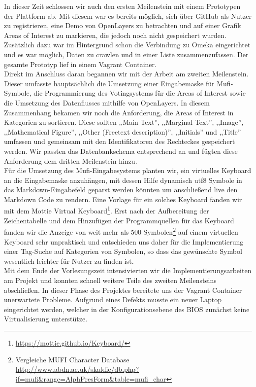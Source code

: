\documentclass{article}
\begin{document}
In dieser Zeit schlossen wir auch den ersten Meilenstein mit einem Prototypen der Plattform ab. 
Mit diesem war es bereits möglich, sich über GitHub als Nutzer zu registrieren, eine Demo von OpenLayers zu betrachten und 
auf einer Grafik Areas of Interest zu markieren, die jedoch noch nicht gespeichert wurden. 
Zusätzlich dazu war im Hintergrund schon die Verbindung zu Omeka eingerichtet und es war möglich, 
Daten zu crawlen und in einer Liste zusammenzufassen. Der gesamte Prototyp lief in einem Vagrant Container.\\
Direkt im Anschluss daran begannen wir mit der Arbeit am zweiten Meilenstein. 
Dieser umfasste hauptsächlich die Umsetzung einer Eingabemaske für Mufi-Symbole, die Programmierung des Votingsystems für die Areas of Interest sowie die Umsetzung des Datenflusses mithilfe von OpenLayers.
In diesem Zusammenhang bekamen wir noch die Anforderung, die Areas of Interest in Kategorien zu sortieren. Diese sollten ,,Main Text'', ,,Marginal Text'', ,,Image'', ,,Mathematical Figure'', ,,Other (Freetext description)'', ,,Initials'' und ,,Title'' 
umfassen und gemeinsam mit den Identifikatoren des Rechteckes gespeichert werden.
Wir passten das Datenbankschema entsprechend an und fügten diese Anforderung dem dritten Meilenstein hinzu.\\
Für die Umsetzung des Mufi-Eingabesystems planten wir, ein virtuelles Keyboard an die Eingabemaske anzuhängen, 
mit dessen Hilfe dynamisch utf8 Symbole in das Markdown-Eingabefeld geparst werden könnten 
um anschließend live den Markdown Code zu rendern.
Eine Vorlage für ein solches Keyboard fanden wir mit dem Mottie Virtual Keyboard\footnote{\url{https://mottie.github.io/Keyboard/}}.
Erst nach der Aufbereitung der Zeichentabelle und dem Hinzufügen der Programmquellen für das Keyboard fanden wir die Anzeige von weit mehr als 500 Symbolen\footnote{Vergleiche MUFI Character Database\\\url{http://www.abdn.ac.uk/skaldic/db.php?if=mufi&range=AlphPresForm&table=mufi_char}} auf einem virtuellen Keyboard sehr unpraktisch und 
entschieden uns daher für die Implementierung einer Tag-Suche auf Kategorien von Symbolen, so dass das gewünschte Symbol wesentlich leichter für Nutzer zu finden ist.\\
Mit dem Ende der Vorlesungszeit intensivierten wir die Implementierungsarbeiten am Projekt und konnten schnell weitere Teile des zweiten Meilensteins abschließen. 
In dieser Phase des Projektes bereitete uns der Vagrant Container unerwartete Probleme. 
Aufgrund eines Defekts musste ein neuer Laptop eingerichtet werden, welcher in der Konfigurationsebene des BIOS zunächst keine Virtualisierung unterstütze.
\end{document}
